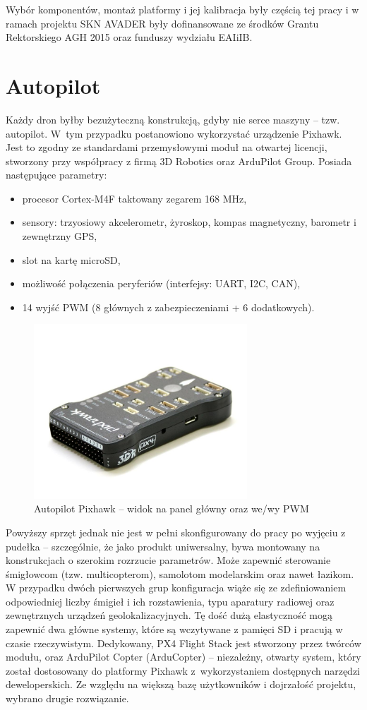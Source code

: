 Wybór komponentów, montaż platformy i jej kalibracja były częścią tej pracy i w ramach projektu SKN AVADER były dofinansowane ze środków Grantu Rektorskiego AGH 2015 oraz funduszy wydziału EAIiIB.

\section{Autopilot}

Każdy dron byłby bezużyteczną konstrukcją, gdyby nie serce maszyny -- tzw. autopilot. 
W~tym przypadku postanowiono wykorzystać urządzenie Pixhawk. 
Jest to zgodny ze standardami przemysłowymi moduł na otwartej licencji, stworzony przy współpracy z firmą 3D Robotics oraz ArduPilot Group. 
Posiada następujące parametry:
\begin{itemize}
	\item procesor Cortex-M4F taktowany zegarem 168 MHz,
	\item sensory: trzyosiowy akcelerometr, żyroskop, kompas magnetyczny, barometr i zewnętrzny GPS,
	\item slot na kartę microSD,
	\item możliwość połączenia peryferiów (interfejsy: UART, I2C, CAN),
	\item 14 wyjść PWM (8 głównych z zabezpieczeniami + 6 dodatkowych).
\end{itemize}

\begin{figure}[h]
	\centering
	\includegraphics[width=8cm]{5_pixhawk.jpg}
	\caption{Autopilot Pixhawk -- widok na panel główny oraz we/wy PWM}
	\label{fig:pixhawk}
\end{figure}

Powyższy sprzęt jednak nie jest w pełni skonfigurowany do pracy po wyjęciu z pudełka -- szczególnie, że jako produkt uniwersalny, bywa montowany na konstrukcjach o szerokim rozrzucie parametrów. 
Może zapewnić sterowanie śmigłowcom (tzw. multicopterom), samolotom modelarskim oraz nawet łazikom. 
W przypadku dwóch pierwszych grup konfiguracja wiąże się ze zdefiniowaniem odpowiedniej liczby śmigieł i ich rozstawienia, typu aparatury radiowej oraz zewnętrznych urządzeń geolokalizacyjnych. 
Tę dość dużą elastyczność mogą zapewnić dwa główne systemy, które są wczytywane z pamięci SD i pracują w czasie rzeczywistym. 
Dedykowany, PX4 Flight Stack jest stworzony przez twórców modułu, oraz ArduPilot Copter (ArduCopter) -- niezależny, otwarty system, który został dostosowany do platformy Pixhawk z~wykorzystaniem dostępnych narzędzi deweloperskich. 
Ze względu na większą bazę użytkowników i dojrzałość projektu, wybrano drugie rozwiązanie.

